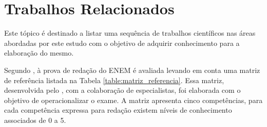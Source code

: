 \section{Trabalhos Relacionados}


Este tópico é destinado a listar uma sequência de trabalhos científicos nas 
áreas abordadas por este estudo com o objetivo de adquirir conhecimento para a
elaboração do mesmo.

Segundo \cite{silvio_taynan:2017}, à prova de redação do ENEM é avaliada 
levando em conta uma matriz de referência listada na Tabela 
\ref{table:matriz_referencia}. Essa matriz, desenvolvida pelo 
\cite{edital_enem:2016}, com a colaboração de especialistas, foi elaborada com 
o objetivo de operacionalizar o exame. A matriz apresenta cinco competências, 
para cada competência expressa para redação existem níveis de conhecimento 
associados de 0 a 5.

